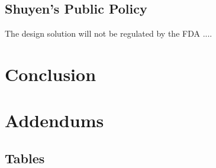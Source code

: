 \documentclass{article}
\begin{document}
\subsection{Shuyen's Public Policy}
\label{sec:Public Policy}
	The design solution will not be regulated by the FDA ....
\section{Conclusion}
\label{sec:conclusion}


\section{Addendums}
\label{sec:addendums}

\subsection{Tables}
\label{sec:tables}
\end{document}
